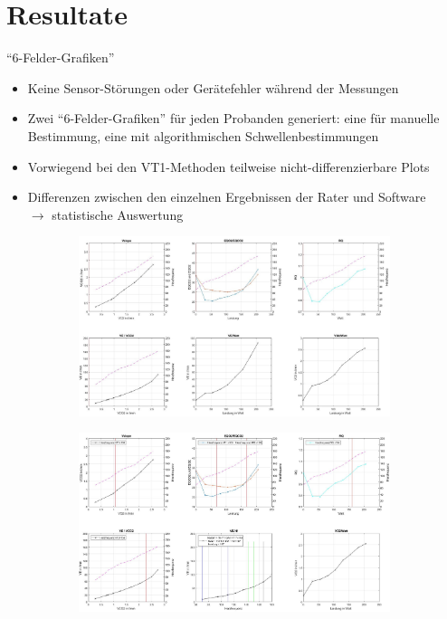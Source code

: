 \documentclass[colorBG,slideColor,8pt]{beamer}
\begin{document}
\section{Resultate}

\begin{frame}{"`6-Felder-Grafiken"'}
	\begin{itemize}
		\item Keine Sensor-Störungen oder Gerätefehler während der Messungen
		\item Zwei "`6-Felder-Grafiken"' für jeden Probanden generiert: eine für manuelle Bestimmung, eine mit algorithmischen Schwellenbestimmungen
		\item Vorwiegend bei den VT1-Methoden teilweise nicht-differenzierbare Plots
		\item Differenzen zwischen den einzelnen Ergebnissen der Rater und Software\\$\rightarrow$ statistische Auswertung
	\end{itemize}
	\begin{figure}[H]
		\begin{subfigure}[c]{0.45\linewidth}
			\centering
			\includegraphics[width=\linewidth]{Bilder/plot_6w.jpg}
		\end{subfigure}
		\hfil
		\begin{subfigure}[c]{0.45\linewidth}
			\centering
			\includegraphics[width=\linewidth]{Bilder/auto_6.png}
		\end{subfigure}
	\end{figure}
\end{frame}
\end{document}
